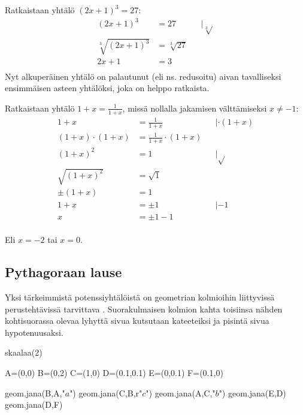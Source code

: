 \begin{esimerkki}
Ratkaistaan yhtälö $(2x+1)^3=27$:
	\begin{align*}
	(2x+1)^3&=27 &&|\sqrt[3]{} \\
	\sqrt[3]{(2x+1)^3}&=\sqrt[3]{27} \\
	2x+1&=3 \\
	\end{align*}
Nyt alkuperäinen yhtälö on palautunut (eli ns. redusoitu) aivan tavalliseksi ensimmäisen asteen yhtälöksi, joka on helppo ratkaista.
\end{esimerkki}

\begin{esimerkki}
Ratkaistaan yhtälö $1+x=\frac{1}{1+x}$, missä nollalla jakamisen välttämiseksi $x\neq-1$:
	\begin{align*}
	1+x&=\frac{1}{1+x} &&| \cdot(1+x) \\
	(1+x)\cdot(1+x)&=\frac{1}{1+x}\cdot(1+x) \\
	(1+x)^2&=1 && |\sqrt{ } \\
	\sqrt{(1+x)^2}&=\sqrt{1} &&\\
	\pm (1+x)&=1&& \\
	1+x &= \pm 1 &&|-1 \\
	x &=\pm 1 -1	 && \\
	\end{align*}

Eli $x=-2$ tai $x=0$.
\end{esimerkki}

\newpage

\subsection{Pythagoraan lause}

Yksi tärkeimmistä potenssiyhtälöistä on geometrian kolmioihin liittyvissä perustehtävissä tarvittava . Suorakulmaisen kolmion kahta toisiinsa nähden kohtisuorassa olevaa lyhyttä sivua kutsutaan kateeteiksi ja pisintä sivua hypotenuusaksi.


\begin{center}
\begin{kuva}
	skaalaa(2)

	A=(0,0)
	B=(0,2)
	C=(1,0)
	D=(0.1,0.1)
	E=(0,0.1)
	F=(0.1,0)

	geom.jana(B,A,"$a$")
	geom.jana(C,B,r"$c$")
	geom.jana(A,C,"$b$")
	geom.jana(E,D)
	geom.jana(D,F)
\end{kuva}
\end{center}

